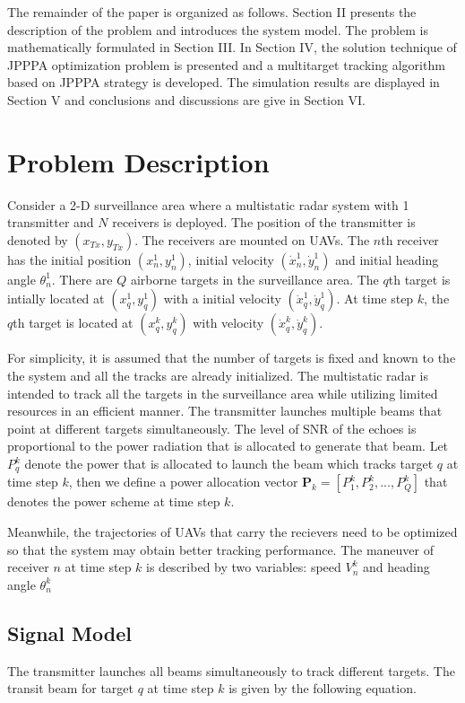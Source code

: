 \documentclass[12pt,journal,draftclsnofoot,onecolumn]{IEEEtran}
\begin{document}
The remainder of the paper is organized as follows. Section II presents the description of the problem and introduces the system model. The problem is mathematically formulated in Section III. In Section IV, the solution technique of JPPPA optimization problem is presented and a multitarget tracking algorithm based on JPPPA strategy is developed. The simulation results are displayed in Section V and conclusions and discussions are give in Section VI. 

\section{Problem Description}
Consider a 2-D surveillance area where a multistatic radar system with 1 transmitter and $N$ receivers is deployed. The position of the transmitter is denoted by $(x_{Tx},y_{Tx})$. The receivers are mounted on UAVs. The $n$th receiver has the initial position $(x_n^1,y_n^1)$, initial velocity $(\dot{x}_n^1,\dot{y}_n^1)$ and initial heading angle $\theta_n^1$. There are $Q$ airborne targets in the surveillance area. The $q$th target is intially located at $(x_q^1,y_q^1)$ with a initial velocity $(\dot{x}_q^1,\dot{y}_q^1)$. At time step $k$, the $q$th target is located at $(x_q^k,y_q^k)$ with velocity $(\dot{x}_q^k,\dot{y}_q^k)$.

For simplicity, it is assumed that the number of targets is fixed and known to the the system and all the tracks are already initialized. The multistatic radar is intended to track all the targets in the surveillance area while utilizing limited resources in an efficient manner. The transmitter launches multiple beams that point at different targets simultaneously. The level of SNR of the echoes is proportional to the power radiation that is allocated to generate that beam. Let $P_q^k$ denote the power that is allocated to launch the beam which tracks target $q$ at time step $k$, then we define a power allocation vector $\mathbf{P}_k=[P_1^k, P_2^k,..., P_Q^k]$ that denotes the power scheme at time step $k$. 

Meanwhile, the trajectories of UAVs that carry the recievers need to be optimized so that the system may obtain better tracking performance. The maneuver of receiver $n$ at time step $k$ is described by two variables: speed $V_n^k$ and heading angle $\theta_n^k$


\subsection{Signal Model}
The transmitter launches all beams simultaneously to track different targets. The transit beam for target $q$ at time step $k$ is given by the following equation.
\end{document}
